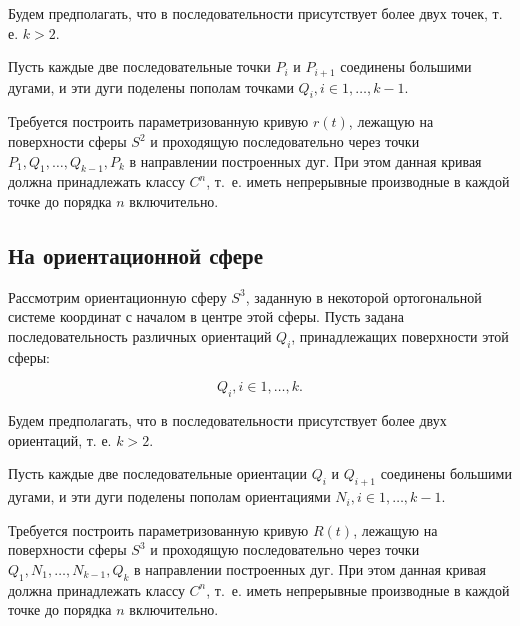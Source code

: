 Будем предполагать, что в последовательности присутствует более двух точек, т. е. $k > 2$.

Пусть каждые две последовательные точки $P_i$ и $P_{i+1}$ соединены большими дугами, и эти дуги поделены пополам
точками $Q_i, i \in {1, \dots, k-1}$.

Требуется построить параметризованную кривую $r(t)$, лежащую на поверхности сферы $S^2$ и проходящую последовательно
через точки $P_1, Q_1, \dots, Q_{k-1}, P_k$ в направлении построенных дуг. При этом данная кривая должна
принадлежать классу $C^n$, т.~е. иметь непрерывные производные в каждой точке до порядка $n$ включительно.

\subsection*{На ориентационной сфере}

Рассмотрим ориентационную сферу $S^3$, заданную в некоторой ортогональной сис\-теме координат с началом в центре этой
сферы. Пусть задана последовательность различных ориентаций $Q_i$, принадлежащих поверхности этой сферы:

$${Q_i}, i \in {1, \dots, k}.$$

Будем предполагать, что в последовательности присутствует более двух ориентаций, т. е. $k > 2$.

Пусть каждые две последовательные ориентации $Q_i$ и $Q_{i+1}$ соединены большими дугами, и эти дуги поделены пополам
ориентациями $N_i, i \in {1, \dots, k-1}$.

Требуется построить параметризованную кривую $R(t)$, лежащую на поверхности сферы $S^3$ и проходящую последовательно
через точки $Q_1, N_1, \dots, N_{k-1}, Q_k$ в направлении построенных дуг. При этом данная кривая должна
принадлежать классу $C^n$, т.~е. иметь непрерывные производные в каждой точке до порядка $n$ включительно.
